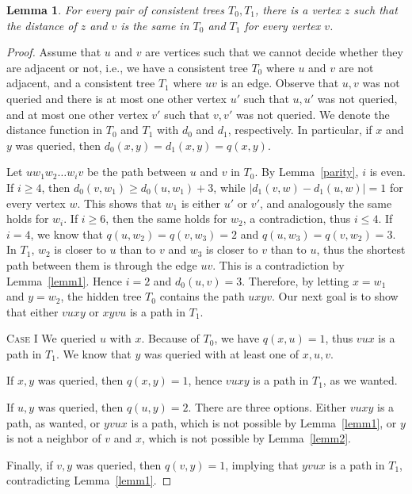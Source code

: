 \documentclass[12pt,a4paper]{amsart}
\theoremstyle{plain}
\newtheorem{lemma}[theorem]{Lemma}
\theoremstyle{definition}
\begin{document}
\begin{lemma}\label{lemnew2}
    For every pair of consistent trees $T_0, T_1$, there is a vertex $z$ such that the distance of $z$ and $v$ is the same in $T_0$ and $T_1$ for every vertex $v$.
\end{lemma}

\begin{proof}
    Assume that $u$ and $v$ are vertices such that we cannot decide whether they are adjacent or not, i.e., we have a consistent tree $T_0$ where $u$ and $v$ are not adjacent, and a consistent tree $T_1$ where $uv$ is an edge. Observe that $u,v$ was not queried and there is at most one other vertex $u'$ such that $u,u'$ was not queried, and at most one other vertex $v'$ such that $v,v'$ was not queried. We denote the distance function in $T_0$ and $T_1$ with $d_0$ and $d_1$, respectively. In particular, if $x$ and $y$ was queried, then $d_0(x,y)=d_1(x,y)=q(x,y)$. 

Let $uw_1w_2\dots w_iv$ be the path between $u$ and $v$ in $T_0$. By Lemma~\ref{parity}, $i$ is even. If $i\ge 4$, then $d_0(v,w_1)\ge d_0(u,w_1)+3$, while $|d_1(v,w)-d_1(u,w)|=1$ for every vertex $w$. This shows that $w_1$ is either $u'$ or $v'$, and analogously the same holds for $w_i$. If $i\ge 6$, then the same holds for $w_2$, a contradiction, thus $i\le 4$. If $i=4$, we know that $q(u,w_2)=q(v,w_3)=2$ and $q(u,w_3)=q(v,w_2)=3$. In $T_1$, $w_2$ is closer to $u$ than to $v$ and $w_3$ is closer to $v$ than to $u$, thus the shortest path between them is through the edge $uv$. This is a contradiction by Lemma~\ref{lemm1}. Hence $i=2$ and $d_0(u,v)=3$. Therefore, by letting $x=w_1$ and $y=w_2$, the hidden tree $T_0$ contains the path $uxyv$. Our next goal is to show that either $vuxy$ or $xyvu$ is a path in $T_1$.

\textsc{Case I}  We queried $u$ with $x$. Because of $T_0$, we have $q(x,u)=1$, thus $vux$ is a path in $T_1$. We know that $y$ was queried with at least one of $x,u,v$. 

If $x,y$ was queried, then $q(x,y)=1$, hence $vuxy$ is a path in $T_1$, as we wanted. 

If $u,y$ was queried, then $q(u,y)=2$. There are three options. Either $vuxy$ is a path, as wanted, or $yvux$ is a path, which is not possible by Lemma~\ref{lemm1}, or $y$ is not a neighbor of $v$ and $x$, which is not possible by Lemma~\ref{lemm2}.

Finally, if $v,y$ was queried, then $q(v,y)=1$, implying that $yvux$ is a path in $T_1$, contradicting Lemma~\ref{lemm1}.


\end{proof}
\end{document}
